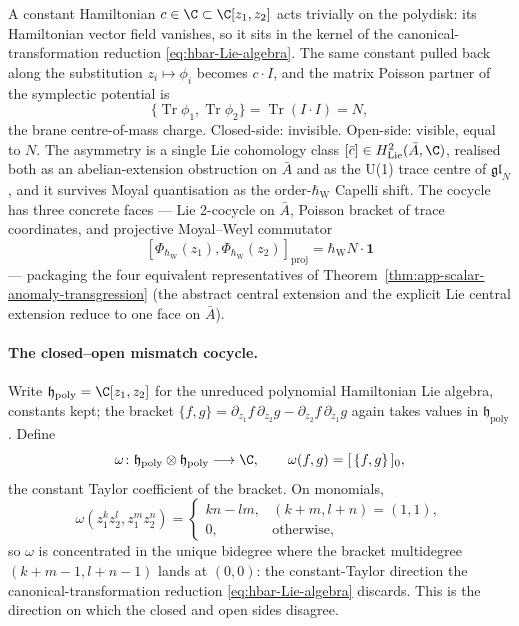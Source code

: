 \documentclass[11pt]{memoir}
\begin{document}
A constant Hamiltonian \(c\in\C\subset\C[z_1,z_2]\) acts trivially on the
polydisk: its Hamiltonian vector field vanishes, so it sits in the kernel of
the canonical-transformation reduction
\eqref{eq:hbar-Lie-algebra}.  The same constant pulled back along the
substitution \(z_i\mapsto\phi_i\) becomes \(c\cdot I\), and the matrix
Poisson partner of the symplectic potential is
\[
  \{\operatorname{Tr}\phi_1,\operatorname{Tr}\phi_2\}
    =\operatorname{Tr}(I\cdot I)=N,
\]
the brane centre-of-mass charge.  Closed-side: invisible.
Open-side: visible, equal to \(N\).  The asymmetry is a single Lie
cohomology class \([\bar c]\in H^2_{\mathrm{Lie}}(\bar A,\C)\),
realised both as an abelian-extension obstruction on \(\bar A\)
and as the U(1) trace centre of \(\mathfrak{gl}_N\), and it
survives Moyal quantisation as the order-\(\hbar_{\mathrm{W}}\) Capelli shift.
The cocycle has three concrete faces --- Lie 2-cocycle on
\(\bar A\), Poisson bracket of trace coordinates, and projective
Moyal--Weyl commutator
\[
  [\Phi_{\hbar_{\mathrm{W}}}(z_1),
   \Phi_{\hbar_{\mathrm{W}}}(z_2)]_{\mathrm{proj}}
    =\hbar_{\mathrm{W}}N\cdot\mathbf 1
\]
--- packaging the four equivalent representatives of
Theorem~\ref{thm:app-scalar-anomaly-transgression} (the abstract
central extension and the explicit Lie central extension reduce
to one face on \(\bar A\)).

\paragraph{The closed--open mismatch cocycle.}
Write \(\mathfrak h_{\mathrm{poly}}=\C[z_1,z_2]\) for the unreduced
polynomial Hamiltonian Lie algebra, constants kept; the bracket
\(\{f,g\}=\partial_{z_1}f\,\partial_{z_2}g
-\partial_{z_2}f\,\partial_{z_1}g\) again takes values in
\(\mathfrak h_{\mathrm{poly}}\).  Define
\[
  \omega\colon
  \mathfrak h_{\mathrm{poly}}\otimes\mathfrak h_{\mathrm{poly}}
    \longrightarrow\C,\qquad
   \omega(f,g)=[\,\{f,g\}\,]_0,
\]
the constant Taylor coefficient of the bracket.  On monomials,
\[
  \omega(z_1^kz_2^l,z_1^mz_2^n)=
  \begin{cases}
    kn-lm, & (k+m,l+n)=(1,1),\\
    0, & \text{otherwise},
  \end{cases}
\]
so \(\omega\) is concentrated in the unique bidegree where the bracket
multidegree \((k+m-1,l+n-1)\) lands at \((0,0)\): the constant-Taylor
direction the canonical-transformation reduction
\eqref{eq:hbar-Lie-algebra} discards.  This is the direction on which
the closed and open sides disagree.
\end{document}
